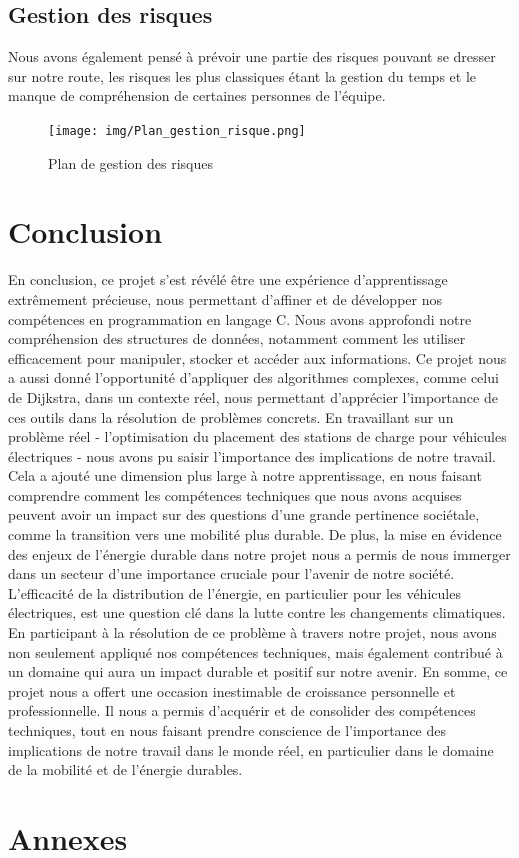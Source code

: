 \documentclass[french,a4paper]{article}
\begin{document}
    \subsection{Gestion des risques}
    Nous avons également pensé à prévoir une partie des risques pouvant se dresser sur notre route, les risques les plus classiques étant
    la gestion du temps et le manque de compréhension de certaines personnes de l'équipe.
    \begin{figure}[H]
        \centering
        \texttt{[image: img/Plan\_gestion\_risque.png]}
        \caption{Plan de gestion des risques}
    \end{figure}

    \section{Conclusion}

    En conclusion, ce projet s'est révélé être une expérience d'apprentissage extrêmement précieuse, nous permettant d'affiner et de développer nos compétences en programmation en langage C. Nous avons approfondi notre compréhension des structures de données, notamment comment les utiliser efficacement pour manipuler, stocker et accéder aux informations. Ce projet nous a aussi donné l'opportunité d'appliquer des algorithmes complexes, comme celui de Dijkstra, dans un contexte réel, nous permettant d'apprécier l'importance de ces outils dans la résolution de problèmes concrets.
    \newline
    En travaillant sur un problème réel - l'optimisation du placement des stations de charge pour véhicules électriques - nous avons pu saisir l'importance des implications de notre travail. Cela a ajouté une dimension plus large à notre apprentissage, en nous faisant comprendre comment les compétences techniques que nous avons acquises peuvent avoir un impact sur des questions d'une grande pertinence sociétale, comme la transition vers une mobilité plus durable.
    \newline
    De plus, la mise en évidence des enjeux de l'énergie durable dans notre projet nous a permis de nous immerger dans un secteur d'une importance cruciale pour l'avenir de notre société. L'efficacité de la distribution de l'énergie, en particulier pour les véhicules électriques, est une question clé dans la lutte contre les changements climatiques. En participant à la résolution de ce problème à travers notre projet, nous avons non seulement appliqué nos compétences techniques, mais également contribué à un domaine qui aura un impact durable et positif sur notre avenir.
    \newline
    En somme, ce projet nous a offert une occasion inestimable de croissance personnelle et professionnelle. Il nous a permis d'acquérir et de consolider des compétences techniques, tout en nous faisant prendre conscience de l'importance des implications de notre travail dans le monde réel, en particulier dans le domaine de la mobilité et de l'énergie durables.

    \section{Annexes}
    
    
    
    
    
\end{document}
